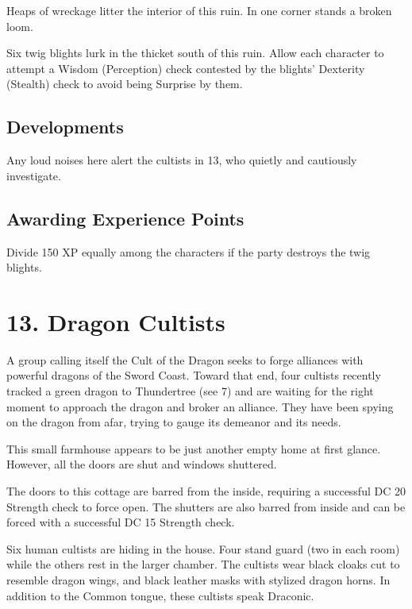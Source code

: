 \documentclass[10pt,a4paper,twoside,bg=print,twocolumn,openany,nodeprecatedcode]{dndbook}
\begin{document}
\begin{DndReadAloud}{}
Heaps of wreckage litter the interior of this ruin. In one corner stands a broken loom.

\end{DndReadAloud}

Six twig blights lurk in the thicket south of this ruin. Allow each character to attempt a Wisdom (Perception) check contested by the blights' Dexterity (Stealth) check to avoid being Surprise by them.

\subsection{Developments}
Any loud noises here alert the cultists in 13, who quietly and cautiously investigate.

\subsection{Awarding Experience Points}
Divide 150 XP equally among the characters if the party destroys the twig blights.

\section{13. Dragon Cultists}
A group calling itself the Cult of the Dragon seeks to forge alliances with powerful dragons of the Sword Coast. Toward that end, four cultists recently tracked a green dragon to Thundertree (see 7) and are waiting for the right moment to approach the dragon and broker an alliance. They have been spying on the dragon from afar, trying to gauge its demeanor and its needs.

\begin{DndReadAloud}{}
This small farmhouse appears to be just another empty home at first glance. However, all the doors are shut and windows shuttered.

\end{DndReadAloud}

The doors to this cottage are barred from the inside, requiring a successful DC 20 Strength check to force open. The shutters are also barred from inside and can be forced with a successful DC 15 Strength check.

Six human cultists are hiding in the house. Four stand guard (two in each room) while the others rest in the larger chamber. The cultists wear black cloaks cut to resemble dragon wings, and black leather masks with stylized dragon horns. In addition to the Common tongue, these cultists speak Draconic.
\end{document}
